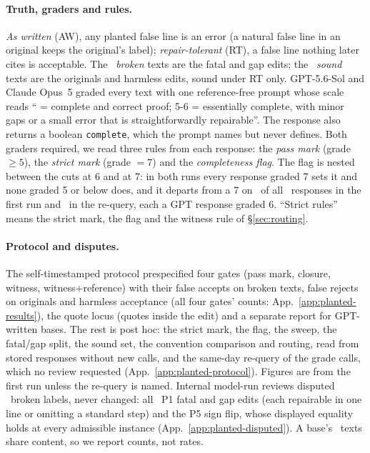 \documentclass{article}
\begin{document}
\paragraph{Truth, graders and rules.} \emph{As written} (AW), any planted false line is an error (a natural false line in an original keeps the original's label); \emph{repair-tolerant} (RT), a false line nothing later cites is acceptable. The \CRNBroken\ \emph{broken} texts are the fatal and gap edits; the \CRNSound\ \emph{sound} texts are the originals and harmless edits, sound under RT only. GPT-5.6-Sol and Claude Opus~5 graded every text with one reference-free prompt whose scale reads `` = complete and correct proof; 5-6 = essentially complete, with minor gaps or a small error that is straightforwardly repairable''. The response also returns a boolean \texttt{complete}, which the prompt names but never defines. Both graders required, we read three rules from each response: the \emph{pass mark} (grade $\ge 5$), the \emph{strict mark} (grade $=7$) and the \emph{completeness flag}. The flag is nested between the cuts at 6 and at 7: in both runs every response graded 7 sets it and none graded 5 or below does, and it departs from a 7 on \CRFlagDepartP\ of all \CRNResponses\ responses in the first run and \CRFlagDepartR\ in the re-query, each a GPT response graded 6. ``Strict rules'' means the strict mark, the flag and the witness rule of \S\ref{sec:routing}.

\paragraph{Protocol and disputes.} The self-timestamped protocol prespecified four gates (pass mark, closure, witness, witness+reference) with their false accepts on broken texts, false rejects on originals and harmless acceptance (all four gates' counts: App.~\ref{app:planted-results}), the quote locus (quotes inside the edit) and a separate report for GPT-written bases. The rest is post hoc: the strict mark, the flag, the sweep, the fatal/gap split, the sound set, the convention comparison and routing, read from stored responses without new calls, and the same-day re-query of the grade calls, which no review requested (App.~\ref{app:planted-protocol}). Figures are from the first run unless the re-query is named. Internal model-run reviews disputed \CRNDisputedWord\ broken labels, never changed: all \CRDisputedProbOne\ P1 fatal and gap edits (each repairable in one line or omitting a standard step) and the P5 sign flip, whose displayed equality holds at every admissible instance (App.~\ref{app:planted-disputed}). A base's \CRTextsPerBaseWord\ texts share content, so we report counts, not rates.
\end{document}
